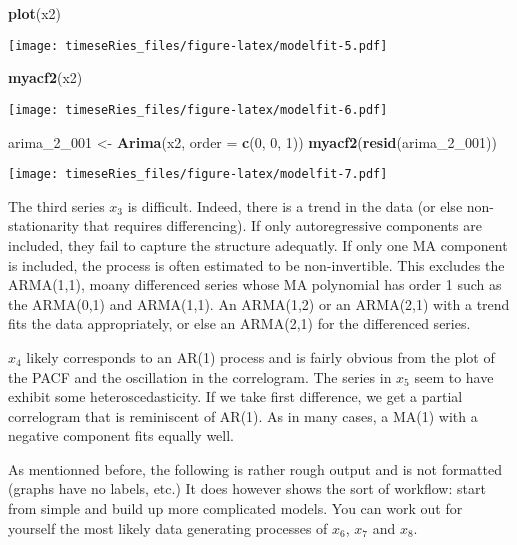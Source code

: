 \documentclass[]{book}
\newenvironment{Shaded}{\begin{snugshade}}{\end{snugshade}}
\newcommand{\DataTypeTok}[1]{\textcolor[rgb]{0.13,0.29,0.53}{#1}}
\newcommand{\DecValTok}[1]{\textcolor[rgb]{0.00,0.00,0.81}{#1}}
\newcommand{\KeywordTok}[1]{\textcolor[rgb]{0.13,0.29,0.53}{\textbf{#1}}}
\newcommand{\NormalTok}[1]{#1}
\newcommand{\StringTok}[1]{\textcolor[rgb]{0.31,0.60,0.02}{#1}}
\begin{document}
\begin{Shaded}
\begin{Highlighting}[]
\KeywordTok{plot}\NormalTok{(x2)}
\end{Highlighting}
\end{Shaded}

\texttt{[image: timeseRies\_files/figure-latex/modelfit-5.pdf]}

\begin{Shaded}
\begin{Highlighting}[]
\KeywordTok{myacf2}\NormalTok{(x2)}
\end{Highlighting}
\end{Shaded}

\texttt{[image: timeseRies\_files/figure-latex/modelfit-6.pdf]}

\begin{Shaded}
\begin{Highlighting}[]
\NormalTok{arima_}\DecValTok{2}\NormalTok{_}\DecValTok{001}\NormalTok{ <-}\StringTok{ }\KeywordTok{Arima}\NormalTok{(x2, }\DataTypeTok{order =} \KeywordTok{c}\NormalTok{(}\DecValTok{0}\NormalTok{, }\DecValTok{0}\NormalTok{, }\DecValTok{1}\NormalTok{))}
\KeywordTok{myacf2}\NormalTok{(}\KeywordTok{resid}\NormalTok{(arima_}\DecValTok{2}\NormalTok{_}\DecValTok{001}\NormalTok{))}
\end{Highlighting}
\end{Shaded}

\texttt{[image: timeseRies\_files/figure-latex/modelfit-7.pdf]}

The third series \(x_3\) is difficult. Indeed, there is a trend in the
data (or else non-stationarity that requires differencing). If only
autoregressive components are included, they fail to capture the
structure adequatly. If only one MA component is included, the process
is often estimated to be non-invertible. This excludes the ARMA(1,1),
moany differenced series whose MA polynomial has order 1 such as the
ARMA(0,1) and ARMA(1,1). An ARMA(1,2) or an ARMA(2,1) with a trend fits
the data appropriately, or else an ARMA(2,1) for the differenced series.

\(x_4\) likely corresponds to an AR(1) process and is fairly obvious
from the plot of the PACF and the oscillation in the correlogram. The
series in \(x_5\) seem to have exhibit some heteroscedasticity. If we
take first difference, we get a partial correlogram that is reminiscent
of AR(1). As in many cases, a MA(1) with a negative component fits
equally well.

As mentionned before, the following is rather rough output and is not
formatted (graphs have no labels, etc.) It does however shows the sort
of workflow: start from simple and build up more complicated models. You
can work out for yourself the most likely data generating processes of
\(x_6\), \(x_7\) and \(x_8\).
\end{document}
